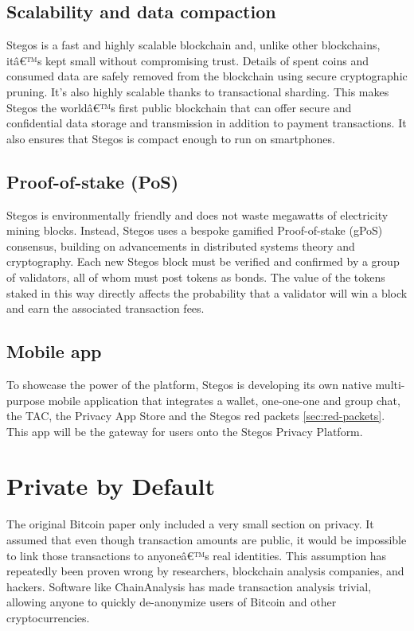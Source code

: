 \documentclass[8pt,fleqn,openany]{book}
\begin{document}
	\subsection{Scalability and data compaction}
	Stegos is a fast and highly scalable blockchain and, unlike other blockchains, itâ€™s kept small without compromising trust. Details of spent coins and consumed data are safely removed from the blockchain using secure cryptographic pruning. It's also highly scalable thanks to transactional sharding. This makes Stegos the worldâ€™s first public blockchain that can offer secure and confidential data storage and transmission in addition to payment transactions. It also ensures that Stegos is compact enough to run on smartphones.
	
	\subsection{Proof-of-stake (PoS)}
	Stegos is environmentally friendly and does not waste megawatts of electricity mining blocks. Instead, Stegos uses a bespoke gamified Proof-of-stake (gPoS) consensus, building on advancements in distributed systems theory and cryptography. Each new Stegos block must be verified and confirmed by a group of validators, all of whom must post tokens as bonds. The value of the tokens staked in this way directly affects the probability that a validator will win a block and earn the associated transaction fees.
	
	\subsection{Mobile app}
	To showcase the power of the platform, Stegos is developing its own native multi-purpose mobile application that integrates a wallet, one-one-one and group chat, the TAC, the Privacy App Store and the Stegos red packets \ref{sec:red-packets}. This app will be the gateway for users onto the Stegos Privacy Platform.
	
	
	\section{Private by Default}
	The original Bitcoin paper only included a very small section on privacy\cite{c1}. It assumed that even though transaction amounts are public, it would be impossible to link those transactions to anyoneâ€™s real identities. This assumption has repeatedly been proven wrong by researchers, blockchain analysis companies, and hackers. Software like ChainAnalysis has made transaction analysis trivial, allowing anyone to quickly de-anonymize users of Bitcoin and other cryptocurrencies.
	
\end{document}
